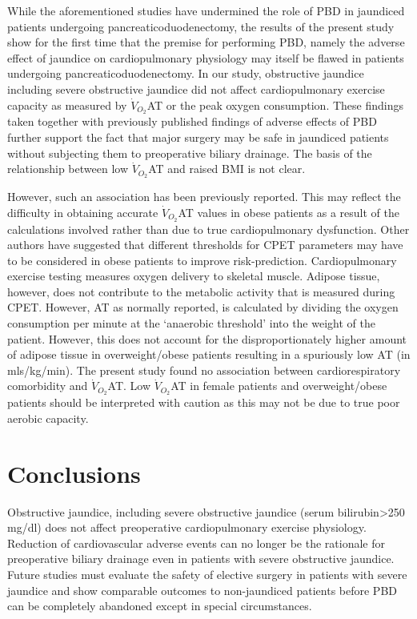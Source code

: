 While the aforementioned studies have undermined the role of PBD in jaundiced patients undergoing pancreaticoduodenectomy, the results of the present study show for the first time that the premise for performing PBD, namely the adverse effect of jaundice on cardiopulmonary physiology may itself be flawed in patients undergoing pancreaticoduodenectomy. In our study, obstructive jaundice including severe obstructive jaundice did not affect cardiopulmonary exercise capacity as measured by $\dot{V}_{O_2}$AT or the peak oxygen consumption. These findings taken together with previously published findings of adverse effects of PBD further support the fact that major surgery may be safe in jaundiced patients without subjecting them to preoperative biliary drainage. 
The basis of the relationship between low $\dot{V}_{O_2}$AT and raised BMI is not clear. 

However, such an association has been previously reported.\parencite{horwich_relationship_2009}  This may reflect the difficulty in obtaining accurate $\dot{V}_{O_2}$AT values in obese patients as a result of the calculations involved rather than due to true cardiopulmonary dysfunction. Other authors have suggested that different thresholds for CPET parameters may have to be considered in obese patients to improve risk-prediction.\parencite{donnelly_criteria_1990,hulens_exercise_2001} Cardiopulmonary exercise testing measures oxygen delivery to skeletal muscle. Adipose tissue, however, does not contribute to the metabolic activity that is measured during CPET. However, AT as normally reported, is calculated by dividing the oxygen consumption per minute at the ‘anaerobic threshold' into the weight of the patient. However, this does not account for the disproportionately higher amount of adipose tissue in overweight/obese patients resulting in a spuriously low AT (in mls/kg/min). The present study found no association between cardiorespiratory comorbidity and $\dot{V}_{O_2}$AT. Low $\dot{V}_{O_2}$AT in female patients and overweight/obese patients should be interpreted with caution as this may not be due to true poor aerobic capacity.

\section{Conclusions}
Obstructive jaundice, including severe obstructive jaundice (serum bilirubin>250 mg/dl) does not affect preoperative cardiopulmonary exercise physiology. Reduction of cardiovascular adverse events can no longer be the rationale for preoperative biliary drainage even in patients with severe obstructive jaundice. Future studies must evaluate the safety of elective surgery in patients with severe jaundice and show comparable outcomes to non-jaundiced patients before PBD can be completely abandoned except in special circumstances.